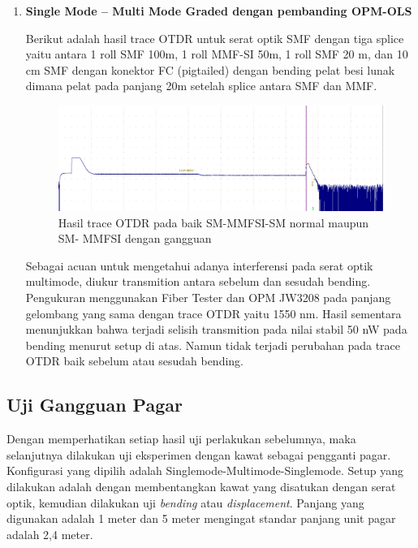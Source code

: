 \documentclass[12pt]{article}
\begin{document}
\begin{enumerate}
		\item \textbf{Single Mode – Multi Mode Graded dengan pembanding OPM-OLS}
		
		Berikut adalah hasil trace OTDR untuk serat optik SMF dengan tiga splice yaitu antara 1 roll SMF 100m, 1 roll MMF-SI 50m, 1 roll SMF 20 m, dan 10 cm SMF dengan konektor FC (pigtailed) dengan bending pelat besi lunak dimana pelat pada panjang 20m setelah splice  antara SMF dan MMF. 
		
		\begin{figure}[h!]
			\centering
			\captionsetup{justification=centering}
			\includegraphics[width=0.5\linewidth]{images/Bab_4/Bab_4_3g1}
			\caption[Trace SM-MMFSI-SM ]{\small{Hasil trace OTDR pada baik SM-MMFSI-SM normal maupun SM- MMFSI dengan gangguan}}
		\end{figure}
	
		Sebagai acuan untuk mengetahui adanya interferensi pada serat optik multimode, diukur transmition antara sebelum dan sesudah bending. 
		Pengukuran menggunakan Fiber Tester dan OPM JW3208 pada panjang gelombang yang sama dengan trace OTDR yaitu 1550 nm.
		Hasil sementara menunjukkan bahwa terjadi selisih transmition pada nilai stabil 50 nW pada bending menurut setup di atas.
		Namun tidak terjadi perubahan pada trace OTDR baik sebelum atau sesudah bending. 
	
	\end{enumerate}

\newpage
	\subsection{Uji Gangguan Pagar}
	
	Dengan memperhatikan setiap hasil uji perlakukan sebelumnya, maka selanjutnya dilakukan uji eksperimen dengan kawat sebagai pengganti pagar. 
	Konfigurasi yang dipilih adalah Singlemode-Multimode-Singlemode.
	Setup yang dilakukan adalah dengan membentangkan kawat yang disatukan dengan serat optik, kemudian dilakukan uji \textit{bending} atau \textit{displacement}.\cite{Tian2017}\cite{Gong2011}\cite{Arifin2015} 
	Panjang yang digunakan adalah 1 meter dan 5 meter mengingat standar panjang unit pagar adalah 2,4 meter.\cite{Pagar2015}
	
\end{document}

